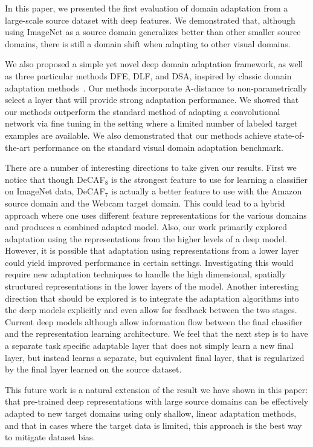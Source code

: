 In this paper, we presented the first evaluation of domain adaptation from a
large-scale source dataset with deep features. We demonstrated that, although
using ImageNet as a source domain generalizes better than other smaller source
domains, there is still a domain shift when adapting to other visual domains.

We also proposed a simple yet novel deep domain adaptation framework, as well as
three particular methods DFE, DLF, and DSA, inspired by classic domain
adaptation methods~\cite{daume, sa}. Our methods incorporate A-distance to
non-parametrically select a layer that will provide strong adaptation
performance. We showed that our methods outperform the standard method of
adapting a convolutional network via fine tuning in the setting where a limited
number of labeled target examples are available. We also demonstrated that our
methods achieve state-of-the-art performance on the standard visual domain
adaptation benchmark.


There are a number of interesting directions to take given our results. First we
notice that though DeCAF$_8$ is the strongest feature to use for learning a
classifier on ImageNet data, DeCAF$_7$ is actually a better feature to use with
the Amazon source domain and the Webcam target domain. This could lead to a
hybrid approach where one uses different feature representations for the various
domains and produces a combined adapted model. Also, our work primarily explored
adaptation using the representations from the higher levels of a deep
model. However, it is possible that adaptation using representations from a
lower layer could yield improved performance in certain settings. Investigating
this would require new adaptation techniques to handle the high dimensional,
spatially structured representations in the lower layers of the model. Another
interesting direction that should be explored is to integrate the adaptation
algorithms into the deep models explicitly and even allow for feedback between
the two stages. Current deep models although allow information flow between the
final classifier and the representation learning architecture. We feel that the
next step is to have a separate task specific adaptable layer that does not
simply learn a new final layer, but instead learns a separate, but equivalent
final layer, that is regularized by the final layer learned on the source
dataset.

This future work is a natural extension of the result we have shown in this
paper: that pre-trained deep representations with large source domains can be
effectively adapted to new target domains using only shallow, linear adaptation
methods, and that in cases where the target data is limited, this approach is
the best way to mitigate dataset bias.
